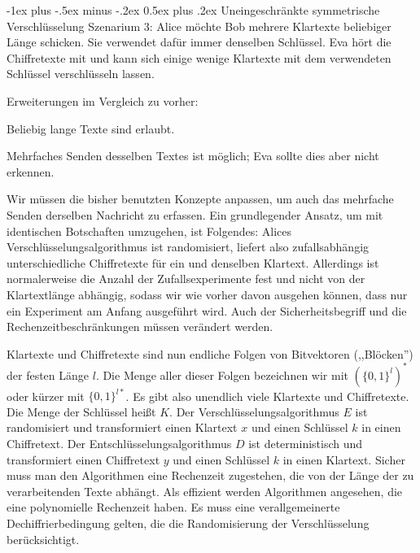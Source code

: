 \documentclass[a4paper]{article}
\makeatletter
\renewcommand{\section}{\@startsection{section}{1}{0mm}%
 {-1ex plus -.5ex minus -.2ex}%
 {0.5ex plus .2ex}%
 {\normalfont\large\bfseries}}
\makeatother
\begin{document}
\begin{multicols}{3}
    \section{Uneingeschränkte symmetrische Verschlüsselung}
    Szenarium 3: Alice möchte Bob mehrere Klartexte beliebiger Länge schicken. Sie verwendet dafür immer denselben Schlüssel. Eva hört die Chiffretexte mit und kann sich einige wenige Klartexte mit dem verwendeten Schlüssel verschlüsseln lassen.

    Erweiterungen im Vergleich zu vorher:
    \begin{enumerate*}
        \item Beliebig lange Texte sind erlaubt.
        \item Mehrfaches Senden desselben Textes ist möglich; Eva sollte dies aber nicht erkennen.
    \end{enumerate*}

    Wir müssen die bisher benutzten Konzepte anpassen, um auch das mehrfache Senden derselben Nachricht zu erfassen. Ein grundlegender Ansatz, um mit identischen Botschaften umzugehen, ist Folgendes: Alices Verschlüsselungsalgorithmus ist randomisiert, liefert also zufallsabhängig unterschiedliche Chiffretexte für ein und denselben Klartext. Allerdings ist normalerweise die Anzahl der Zufallsexperimente fest und nicht von der Klartextlänge abhängig, sodass wir wie vorher davon ausgehen können, dass nur ein Experiment am Anfang ausgeführt wird. Auch der Sicherheitsbegriff und die Rechenzeitbeschränkungen müssen verändert werden.

    Klartexte und Chiffretexte sind nun endliche Folgen von Bitvektoren (,,Blöcken'') der festen Länge $l$. Die Menge aller dieser Folgen bezeichnen wir mit $(\{0,1\}^l)^*$ oder kürzer mit $\{0,1\}^{l*}$. Es gibt also unendlich viele Klartexte und Chiffretexte. Die Menge der Schlüssel heißt $K$. Der Verschlüsselungsalgorithmus $E$ ist randomisiert und transformiert einen Klartext $x$ und einen Schlüssel $k$ in einen Chiffretext. Der Entschlüsselungsalgorithmus $D$ ist deterministisch und transformiert einen Chiffretext $y$ und einen Schlüssel $k$ in einen Klartext. Sicher muss man den Algorithmen eine Rechenzeit zugestehen, die von der Länge der zu verarbeitenden Texte abhängt. Als effizient werden Algorithmen angesehen, die eine polynomielle Rechenzeit haben. Es muss eine verallgemeinerte Dechiffrierbedingung gelten, die die Randomisierung der Verschlüsselung berücksichtigt.


\end{multicols}
\end{document}
